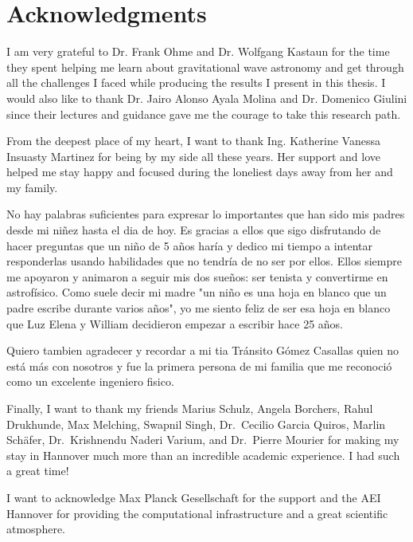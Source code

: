\chapter*{Acknowledgments}

I am very grateful to Dr. Frank Ohme and Dr. Wolfgang Kastaun for the time they spent helping me learn about gravitational wave astronomy and get through all the challenges I faced while producing the results I present in this thesis. I would also like to thank Dr. Jairo Alonso Ayala Molina and Dr. Domenico Giulini since their lectures and guidance gave me the courage to take this research path.

From the deepest place of my heart, I want to thank Ing. Katherine Vanessa Insuasty Martinez for being by my side all these years. Her support and love helped me stay happy and focused during the loneliest days away from her and my family.

No hay palabras suficientes para expresar lo importantes que han sido mis padres desde mi niñez hasta el dia de hoy. Es gracias a ellos que sigo disfrutando de hacer preguntas que un niño de 5 años haría y dedico mi tiempo a intentar responderlas usando habilidades que no tendría de no ser por ellos. Ellos siempre me apoyaron y animaron a seguir mis dos sueños: ser tenista y convertirme en astrofísico. Como suele decir mi madre "un niño es una hoja en blanco que un padre escribe durante varios años", yo me siento feliz de ser esa hoja en blanco que Luz Elena y William decidieron empezar a escribir hace 25 años.

Quiero tambien agradecer y recordar a mi tia Tránsito Gómez Casallas quien no está más con nosotros y fue la primera persona de mi familia que me reconoció como un excelente ingeniero fisico.

Finally, I want to thank my friends Marius Schulz, Angela Borchers, Rahul Drukhunde, Max Melching, Swapnil Singh, Dr.~Cecilio Garcia Quiros, Marlin Schäfer, Dr.~Krishnendu Naderi Varium, and Dr.~Pierre Mourier for making my stay in Hannover much more than an incredible academic experience. I had such a great time!

I want to acknowledge Max Planck Gesellschaft for the support and the AEI Hannover for providing the computational infrastructure and a great scientific atmosphere.
